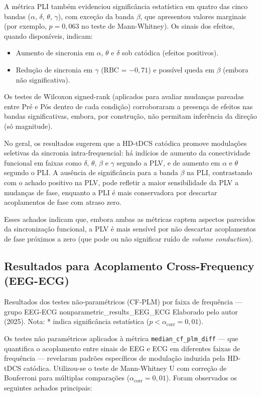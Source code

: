 A métrica PLI também evidenciou significância estatística em quatro das cinco bandas ($\alpha$, $\delta$, $\theta$, $\gamma$), com exceção da banda $\beta$, que apresentou valores marginais (por exemplo, $p = 0{,}063$ no teste de Mann-Whitney). Os sinais dos efeitos, quando disponíveis, indicam:
\begin{itemize}
  \item Aumento de sincronia em $\alpha$, $\theta$ e $\delta$ sob catódica (efeitos positivos).
  \item Redução de sincronia em $\gamma$ (RBC = $-0{,}71$) e possível queda em $\beta$ (embora não significativa).
\end{itemize}

Os testes de Wilcoxon signed-rank (aplicados para avaliar mudanças pareadas entre Pré e Pós dentro de cada condição) corroboraram a presença de efeitos nas bandas significativas, embora, por construção, não permitam inferência da direção (só magnitude).

No geral, os resultados sugerem que a HD-tDCS catódica promove modulações seletivas da sincronia intra-frequencial: há indícios de aumento da conectividade funcional em faixas como $\delta$, $\theta$, $\beta$ e $\gamma$ segundo a PLV, e de aumento em $\alpha$ e $\theta$ segundo o PLI. A ausência de significância para a banda $\beta$ na PLI, contrastando com o achado positivo na PLV, pode refletir a maior sensibilidade da PLV a mudanças de fase, enquanto a PLI é mais conservadora por descartar acoplamentos de fase com atraso zero.

Esses achados indicam que, embora ambas as métricas captem aspectos parecidos da sincronização funcional, a PLV é mais sensível por não descartar acoplamentos de fase próximos a zero (que pode ou não significar ruído de \textit{volume conduction}).

\subsection{Resultados para Acoplamento Cross-Frequency (EEG-ECG)}

{Resultados dos testes não-paramétricos (CF‑PLM) por faixa de frequência — grupo EEG-ECG}
{nonparametric_results_EEG_ECG}
{Elaborado pelo autor (2025). Nota: * indica significância estatística ($p < \alpha_{\mathrm{corr}}=0{,}01$).}

Os testes não paramétricos aplicados à métrica \texttt{median\_cf\_plm\_diff} — que quantifica o acoplamento entre sinais de EEG e ECG em diferentes faixas de frequência — revelaram padrões específicos de modulação induzida pela HD-tDCS catódica. Utilizou-se o teste de Mann-Whitney U com correção de Bonferroni para múltiplas comparações ($\alpha_{\mathrm{corr}}=0{,}01$). Foram observados os seguintes achados principais:

